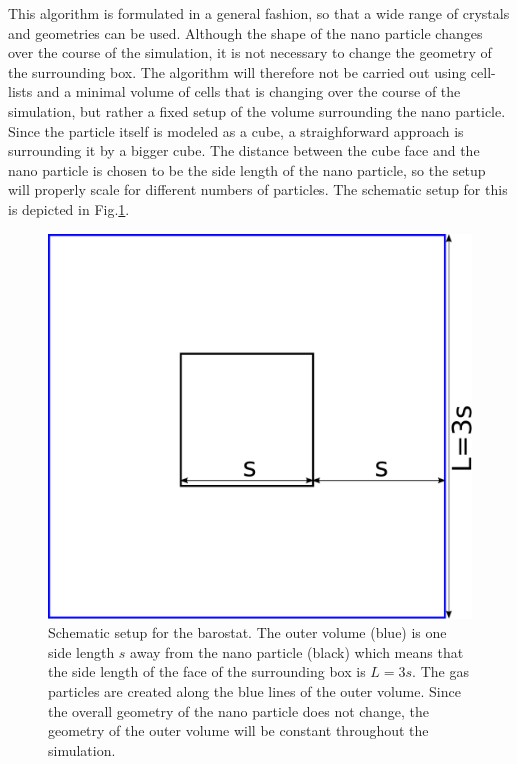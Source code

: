 \documentclass[12pt]{article}
\begin{document}
This algorithm is formulated in a general fashion, so that a wide range of crystals and geometries can be used. 
Although the shape of the nano particle changes over the course of the simulation, it is not necessary to change the geometry of the surrounding box.
The algorithm will therefore not be carried out using cell-lists and a minimal volume of cells that is changing over the course of the simulation, 
but rather a fixed setup of the volume surrounding the nano particle.\\ 
Since the particle itself is modeled as a cube, a straighforward approach is surrounding it by a bigger cube. The distance between the cube face and the nano
particle is chosen to be the side length of the nano particle, so the setup will properly scale for different numbers of particles. 
The schematic setup for this is depicted in Fig.\ref{fig:gascube}.
\begin{figure}[h]
    \begin{center}
        \includegraphics[scale=0.5]{images/gas_volume_ver3.pdf}
        \caption{Schematic setup for the barostat. The outer volume (blue) is one side length $s$ away from the nano particle (black) which means that
            the side length of the face of the surrounding box is $L=3s$. 
                    The gas particles are created along the blue lines of the outer volume. Since the overall geometry of the nano particle does 
                    not change, 
                    the geometry of the outer volume will be constant throughout the simulation.}
        \label{fig:gascube}
    \end{center}
\end{figure}
\end{document}
